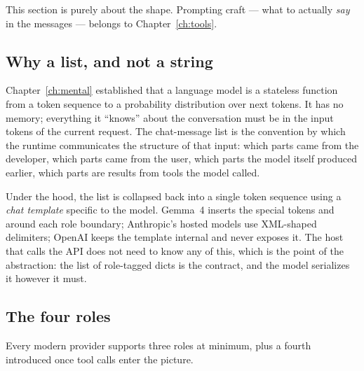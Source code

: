 This section is purely about the shape. Prompting craft --- what
to actually \emph{say} in the messages --- belongs to
Chapter~\ref{ch:tools}.

\subsection{Why a list, and not a string}
\label{sec:work-chats-why}

Chapter~\ref{ch:mental} established that a language model is a
stateless function from a token sequence to a probability
distribution over next tokens. It has no memory; everything it
``knows'' about the conversation must be in the input tokens of
the current request. The chat-message list is the convention by
which the runtime communicates the structure of that input: which
parts came from the developer, which parts came from the user,
which parts the model itself produced earlier, which parts are
results from tools the model called.

Under the hood, the list is collapsed back into a single token
sequence using a \emph{chat template} specific to the model.
Gemma~4 inserts the special tokens  and
 around each role boundary; Anthropic's
hosted models use XML-shaped delimiters; OpenAI keeps the
template internal and never exposes it. The host that calls the
API does not need to know any of this, which is the point of the
abstraction: the list of role-tagged dicts is the contract, and
the model serializes it however it must.

\subsection{The four roles}
\label{sec:work-chats-roles}

Every modern provider supports three roles at minimum, plus a
fourth introduced once tool calls enter the picture.


